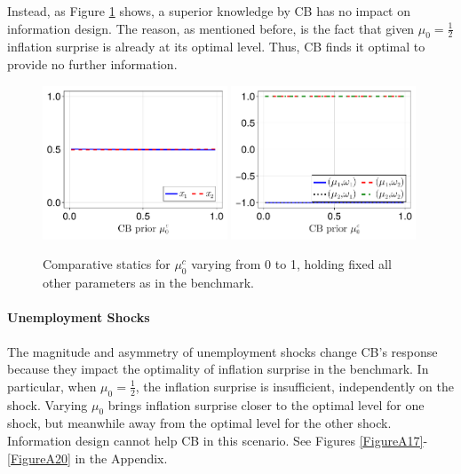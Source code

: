 \documentclass[12pt,a4paper]{article}
\begin{document}
Instead, as Figure \ref{Figure4} shows, a superior knowledge by CB has no impact on information design. The reason, as mentioned before, is the fact that given $\mu_0=\frac{1}{2}$ inflation surprise is already at its optimal level. Thus, CB finds it optimal to provide no further information.

\begin{figure}[H]
\centering
\includegraphics[width=0.49\textwidth]{figures/V8/γ_1/fig_optimal_π_across_μ_0_c_ω_1_1_ω_2_-1_δ_0.5_.pdf}
\includegraphics[width=0.49\textwidth]{figures/V8/γ_1/fig_posterior_across_μ_0_c_ω_1_1_ω_2_-1_δ_0.5_.pdf}
\caption{Comparative statics for $\mu_0^c$ varying from 0 to 1, holding fixed all other parameters as in the benchmark.}
\label{Figure4}
\end{figure}

\paragraph{Unemployment Shocks}
The magnitude and asymmetry of unemployment shocks change CB's response because they impact the optimality of inflation surprise in the benchmark. In particular, when $\mu_0=\frac{1}{2}$, the inflation surprise is insufficient, independently on the shock. Varying $\mu_0$ brings inflation surprise closer to the optimal level for one shock, but meanwhile away from the optimal level for the other shock. Information design cannot help CB in this scenario. See Figures \ref{FigureA17}-\ref{FigureA20} in the Appendix.
\end{document}
